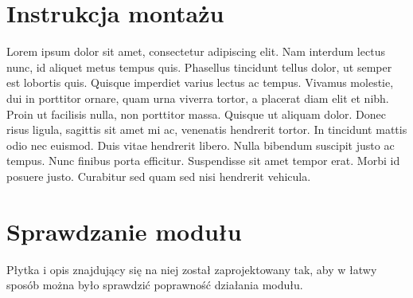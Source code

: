 \documentclass[12pt, eng, twoside, openany, final]{mgr}
\begin{document}
    \section{Instrukcja montażu}
    Lorem ipsum dolor sit amet, consectetur adipiscing elit. Nam interdum lectus nunc, id aliquet metus tempus quis. Phasellus tincidunt tellus dolor, ut semper est lobortis quis. Quisque imperdiet varius lectus ac tempus. Vivamus molestie, dui in porttitor ornare, quam urna viverra tortor, a placerat diam elit et nibh. Proin ut facilisis nulla, non porttitor massa. Quisque ut aliquam dolor. Donec risus ligula, sagittis sit amet mi ac, venenatis hendrerit tortor. In tincidunt mattis odio nec euismod. Duis vitae hendrerit libero. Nulla bibendum suscipit justo ac tempus. Nunc finibus porta efficitur. Suspendisse sit amet tempor erat. Morbi id posuere justo. Curabitur sed quam sed nisi hendrerit vehicula.

    \section{Sprawdzanie modułu}
            Płytka i opis znajdujący się na niej został zaprojektowany tak, aby w łatwy sposób można było sprawdzić poprawność działania modułu. 
            
\end{document}
